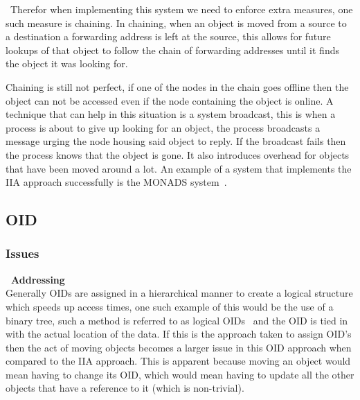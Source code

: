 \documentclass[a4paper,12pt]{article}
\begin{document}
\noindent~Therefor when implementing this system we need to enforce extra measures, one such measure is chaining. 
In chaining, when an object is moved from a source to a destination a forwarding address is left at the source, this allows for future lookups of that object to follow the chain of forwarding addresses until it finds the object it was looking for.

Chaining is still not perfect, if one of the nodes in the chain goes offline then the object can not be accessed even if the node containing the object is online. A technique that can help in this situation is a system broadcast, this is when a process is about to give up looking for an object, the process broadcasts a message urging the node housing said object to reply. If the broadcast fails then the process knows that the object is gone.
It also introduces overhead for objects that have been moved around a lot.
An example of a system that implements the IIA approach successfully is the MONADS system~\citep{moved-modules-in-monads}.

\subsection*{OID}

\subsubsection*{Issues}
\textbf{\indent~Addressing}\\
Generally OIDs are assigned in a hierarchical manner to create a logical structure which speeds up access times, one such example of this would be the use of a binary tree, such a method is referred to as logical OIDs~\citep{oid} and the OID is tied in with the actual location of the data.
If this is the approach taken to assign OID's then the act of moving objects becomes a larger issue in this OID approach when compared to the IIA approach.
This is apparent because moving an object would mean having to change its OID, which would mean having to update all the other objects that have a reference to it (which is non-trivial). 
\end{document}
